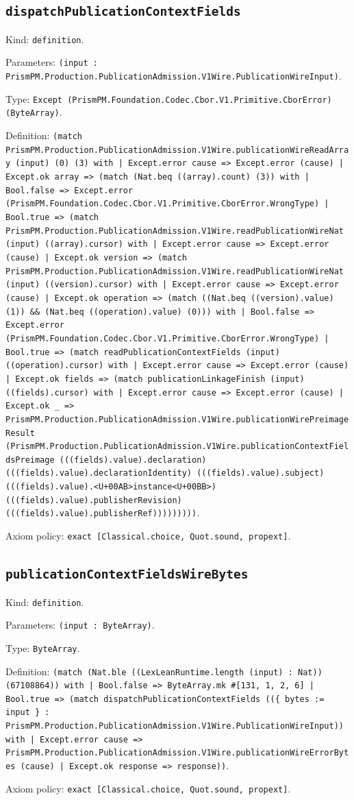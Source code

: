 \documentclass[11pt]{article}
\begin{document}
\subsection*{\texttt{dispatchPublicationContextFields}}
\noindent Kind: \texttt{definition}.\par
\noindent Parameters: \texttt{(input : PrismPM.Production.PublicationAdmission.V1Wire.PublicationWireInput)}.\par
\noindent Type: \texttt{Except (PrismPM.Foundation.Codec.Cbor.V1.Primitive.CborError) (ByteArray)}.\par
\noindent Definition: \texttt{(match PrismPM.Production.PublicationAdmission.V1Wire.publicationWireReadArray (input) (0) (3) with | Except.error cause => Except.error (cause) | Except.ok array => (match (Nat.beq ((array).count) (3)) with | Bool.false => Except.error (PrismPM.Foundation.Codec.Cbor.V1.Primitive.CborError.WrongType) | Bool.true => (match PrismPM.Production.PublicationAdmission.V1Wire.readPublicationWireNat (input) ((array).cursor) with | Except.error cause => Except.error (cause) | Except.ok version => (match PrismPM.Production.PublicationAdmission.V1Wire.readPublicationWireNat (input) ((version).cursor) with | Except.error cause => Except.error (cause) | Except.ok operation => (match ((Nat.beq ((version).value) (1)) \&\& (Nat.beq ((operation).value) (0))) with | Bool.false => Except.error (PrismPM.Foundation.Codec.Cbor.V1.Primitive.CborError.WrongType) | Bool.true => (match readPublicationContextFields (input) ((operation).cursor) with | Except.error cause => Except.error (cause) | Except.ok fields => (match publicationLinkageFinish (input) ((fields).cursor) with | Except.error cause => Except.error (cause) | Except.ok \_ => PrismPM.Production.PublicationAdmission.V1Wire.publicationWirePreimageResult (PrismPM.Production.PublicationAdmission.V1Wire.publicationContextFieldsPreimage (((fields).value).declaration) (((fields).value).declarationIdentity) (((fields).value).subject) (((fields).value).<U+00AB>instance<U+00BB>) (((fields).value).publisherRevision) (((fields).value).publisherRef)))))))))}.\par
\noindent Axiom policy: \texttt{exact [Classical.choice, Quot.sound, propext]}.\par
\subsection*{\texttt{publicationContextFieldsWireBytes}}
\noindent Kind: \texttt{definition}.\par
\noindent Parameters: \texttt{(input : ByteArray)}.\par
\noindent Type: \texttt{ByteArray}.\par
\noindent Definition: \texttt{(match (Nat.ble ((LexLeanRuntime.length (input) : Nat)) (67108864)) with | Bool.false => ByteArray.mk \#[131, 1, 2, 6] | Bool.true => (match dispatchPublicationContextFields ((\{ bytes := input \} : PrismPM.Production.PublicationAdmission.V1Wire.PublicationWireInput)) with | Except.error cause => PrismPM.Production.PublicationAdmission.V1Wire.publicationWireErrorBytes (cause) | Except.ok response => response))}.\par
\noindent Axiom policy: \texttt{exact [Classical.choice, Quot.sound, propext]}.\par
\end{document}
